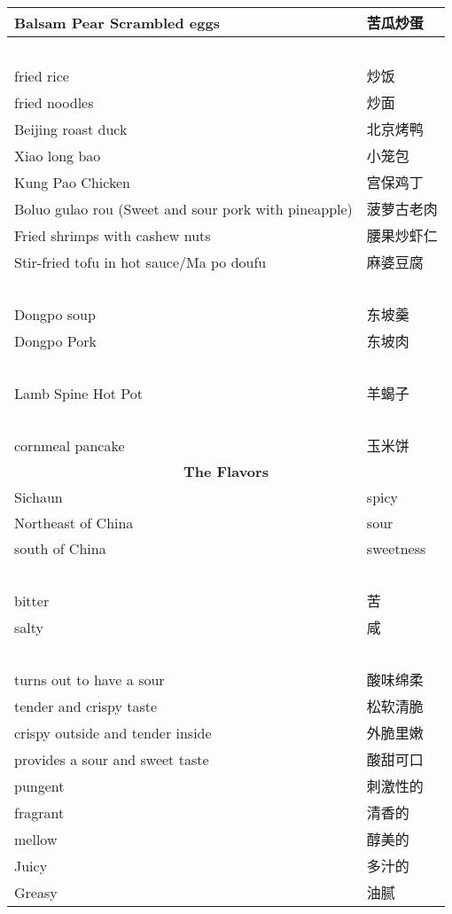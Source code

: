 \begin{longtable}{|p{7cm}|p{7cm}|}
    Balsam Pear Scrambled eggs & 苦瓜炒蛋 \\ \hline
    ~ & ~ \\ \hline
    fried rice & 炒饭 \\ \hline
    fried noodles & 炒面 \\ \hline
    Beijing roast duck & 北京烤鸭 \\ \hline
    Xiao long bao & 小笼包 \\ \hline
    Kung Pao Chicken & 宫保鸡丁 \\ \hline
    Boluo gulao rou (Sweet and sour pork with pineapple) & 菠萝古老肉 \\ \hline
    Fried shrimps with cashew nuts & 腰果炒虾仁 \\ \hline
    Stir-fried tofu in hot sauce/Ma po doufu & 麻婆豆腐 \\ \hline
    ~ & ~ \\ \hline
    Dongpo soup & 东坡羹 \\ \hline
    Dongpo Pork & 东坡肉 \\ \hline
    ~ & ~ \\ \hline
    Lamb Spine Hot Pot & 羊蝎子 \\ \hline
    ~ & ~ \\ \hline
    cornmeal pancake & 玉米饼 \\ \hline
    
    \multicolumn{2}{c}{\textbf{The Flavors}} \\ \hline
    Sichaun & spicy \\ \hline
    Northeast of China & sour \\ \hline
    south of China & sweetness \\ \hline
    ~ & ~ \\ \hline
    bitter & 苦 \\ \hline
    salty & 咸 \\ \hline
    ~ & ~ \\ \hline
    turns out to have a sour & 酸味绵柔 \\ \hline
    tender and crispy taste & 松软清脆 \\ \hline
    crispy outside and tender inside & 外脆里嫩 \\ \hline
    provides a sour and sweet taste & 酸甜可口 \\ \hline
    pungent & 刺激性的 \\ \hline
    fragrant & 清香的 \\ \hline
    mellow & 醇美的 \\ \hline
    Juicy & 多汁的 \\ \hline
    Greasy & 油腻 \\ \hline
    

\end{longtable}
